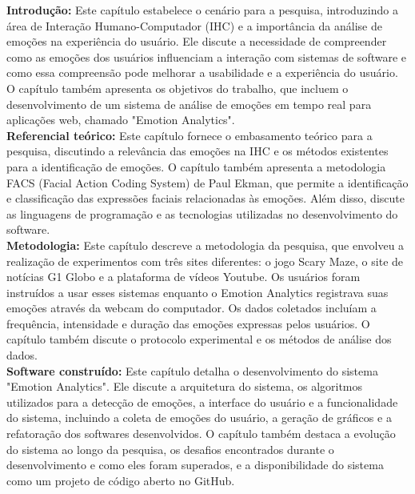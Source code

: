 \begin{resumo-portugues}

  \textbf{Introdução:} Este capítulo estabelece o cenário para a pesquisa, introduzindo a área de Interação Humano-Computador (IHC) e a importância da análise de emoções na experiência do usuário. Ele discute a necessidade de compreender como as emoções dos usuários influenciam a interação com sistemas de software e como essa compreensão pode melhorar a usabilidade e a experiência do usuário. O capítulo também apresenta os objetivos do trabalho, que incluem o desenvolvimento de um sistema de análise de emoções em tempo real para aplicações web, chamado "Emotion Analytics".
  \\

  \textbf{Referencial teórico:} Este capítulo fornece o embasamento teórico para a pesquisa, discutindo a relevância das emoções na IHC e os métodos existentes para a identificação de emoções. O capítulo também apresenta a metodologia FACS (Facial Action Coding System) de Paul Ekman, que permite a identificação e classificação das expressões faciais relacionadas às emoções. Além disso, discute as linguagens de programação e as tecnologias utilizadas no desenvolvimento do software.
  \\

  \textbf{Metodologia:} Este capítulo descreve a metodologia da pesquisa, que envolveu a realização de experimentos com três sites diferentes: o jogo Scary Maze, o site de notícias G1 Globo e a plataforma de vídeos Youtube. Os usuários foram instruídos a usar esses sistemas enquanto o Emotion Analytics registrava suas emoções através da webcam do computador. Os dados coletados incluíam a frequência, intensidade e duração das emoções expressas pelos usuários. O capítulo também discute o protocolo experimental e os métodos de análise dos dados.
  \\

  \textbf{Software construído:} Este capítulo detalha o desenvolvimento do sistema "Emotion Analytics". Ele discute a arquitetura do sistema, os algoritmos utilizados para a detecção de emoções, a interface do usuário e a funcionalidade do sistema, incluindo a coleta de emoções do usuário, a geração de gráficos e a refatoração dos softwares desenvolvidos. O capítulo também destaca a evolução do sistema ao longo da pesquisa, os desafios encontrados durante o desenvolvimento e como eles foram superados, e a disponibilidade do sistema como um projeto de código aberto no GitHub.
  \pagebreak


\end{resumo-portugues}
